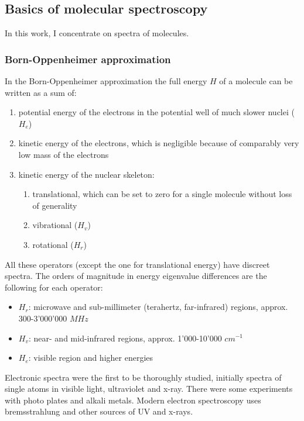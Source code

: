 \subsection{Basics of molecular spectroscopy}

In this work, I concentrate on spectra of molecules.

\subsubsection{Born-Oppenheimer approximation}

In the Born-Oppenheimer approximation the full energy $H$ of a molecule can be written as a sum of:
\begin{enumerate}
	\item potential energy of the electrons in the potential well of much slower nuclei ($H_e$)
	\item kinetic energy of the electrons, which is negligible because of comparably very low mass of the electrons
	\item kinetic energy of the nuclear skeleton:
	\begin{enumerate}
		\item translational, which can be set to zero for a single molecule without loss of generality
		\item vibrational ($H_v$)
		\item rotational ($H_r$)
	\end{enumerate}	
\end{enumerate}

All these operators (except the one for translational energy) have discreet spectra. The orders of magnitude in energy eigenvalue differences are the following for each operator:
\begin{itemize}
	\item $H_r$: microwave and sub-millimeter (terahertz, far-infrared) regions, approx. 300-3'000'000 $MHz$
	\item $H_v$: near- and mid-infrared regions, approx. 1'000-10'000 $cm^{-1}$
	\item $H_e$: visible region and higher energies
\end{itemize}	

Electronic spectra were the first to be thoroughly studied, initially spectra of single atoms in visible light, ultraviolet and x-ray. There were some experiments with photo plates and alkali metals. Modern electron spectroscopy uses bremsstrahlung and other sources of UV and x-rays.

